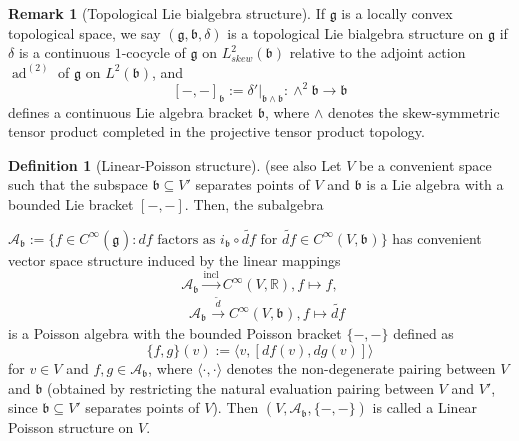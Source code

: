 \documentclass[11pt,reqno]{amsart}
\theoremstyle{definition}
\newtheorem{definition}[theorem]{Definition}
\newtheorem{remark}[theorem]{Remark}
\numberwithin{equation}{section}
\begin{document}
\begin{remark}[Topological Lie bialgebra structure]
If $\mathfrak{g}$ is a locally convex topological space, we say $(\mathfrak{g}, \mathfrak{b}, \delta)$ is a topological Lie bialgebra structure on $\mathfrak{g}$ if $\delta $ is a continuous $1$-cocycle of $\mathfrak{g}$ on $L^2_{skew}(\mathfrak{b})$ relative to the adjoint action $\operatorname{ad}^{(2)}$ of $\mathfrak{g}$ on $L^2(\mathfrak{b})$, and
\[
[-, -]_{\mathfrak{b}} := \delta'|_{\mathfrak b \wedge\mathfrak b} : \wedge^2\mathfrak{b} \rightarrow \mathfrak{b}
\]
defines a continuous Lie algebra bracket $\mathfrak{b}$, where $\wedge$ denotes the skew-symmetric tensor product completed in the projective tensor product topology.
\end{remark}
\begin{definition}[Linear-Poisson structure](see also \cite[Corollary 2.11]{25}
Let $V$ be a convenient space such that the subspace $\mathfrak b\subseteq V'$ separates points of $V$ and $\mathfrak b$ is a Lie algebra with a bounded Lie bracket $[-,-]$. Then, the subalgebra

$\mathcal{A}_{\mathfrak{b}}:=\{f\in C^{\infty}(\mathfrak g_{}): df \text{ factors as } i_{\mathfrak b_{}}\circ\widetilde{df} \text{ for  } \widetilde{df}\in C^\infty(V,\mathfrak b_{})\}$ has convenient vector space structure induced by the linear mappings 
$$ \mathcal A_{\mathfrak b_{}} \xrightarrow{\text{incl}} C^{\infty}(V,\mathbb R), f\mapsto f,$$
$$\quad  
 \mathcal  A_{\mathfrak b_{}} \xrightarrow {\widetilde{d}} C^\infty(V, \mathfrak b_{}), f\mapsto \widetilde{df}$$ is a Poisson algebra with the bounded Poisson bracket $\{-,-\}$ defined as
\[
\{f,g\}(v):=\langle v, [df(v), dg(v)]\rangle
\]
for $v\in V$ and $f, g\in \mathcal A_{\mathfrak b}$, where $\langle \cdot, \cdot \rangle$ denotes the non-degenerate pairing between $V$ and $\mathfrak{b}$ (obtained by restricting the natural evaluation pairing between $V$ and $V'$, since $\mathfrak{b} \subseteq V'$ separates points of $V$). 
Then $(V, \mathcal{A}_{\mathfrak{b}}, \{-, -\})$ is called a Linear Poisson structure on $V$. 
\end{definition}
\end{document}
